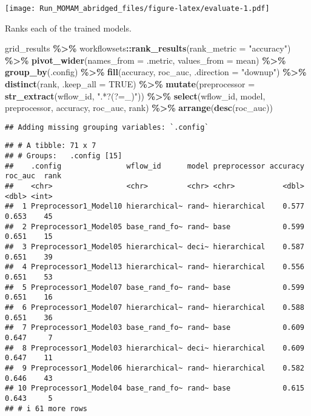 \documentclass[
]{article}
\newenvironment{Shaded}{\begin{snugshade}}{\end{snugshade}}
\newcommand{\AttributeTok}[1]{\textcolor[rgb]{0.13,0.29,0.53}{#1}}
\newcommand{\ConstantTok}[1]{\textcolor[rgb]{0.56,0.35,0.01}{#1}}
\newcommand{\FunctionTok}[1]{\textcolor[rgb]{0.13,0.29,0.53}{\textbf{#1}}}
\newcommand{\NormalTok}[1]{#1}
\newcommand{\SpecialCharTok}[1]{\textcolor[rgb]{0.81,0.36,0.00}{\textbf{#1}}}
\newcommand{\StringTok}[1]{\textcolor[rgb]{0.31,0.60,0.02}{#1}}
\begin{document}
\texttt{[image: Run\_MOMAM\_abridged\_files/figure-latex/evaluate-1.pdf]}

Ranks each of the trained models.

\begin{Shaded}
\begin{Highlighting}[]
\NormalTok{grid\_results }\SpecialCharTok{\%\textgreater{}\%} 
\NormalTok{  workflowsets}\SpecialCharTok{::}\FunctionTok{rank\_results}\NormalTok{(}\AttributeTok{rank\_metric =} \StringTok{"accuracy"}\NormalTok{) }\SpecialCharTok{\%\textgreater{}\%}
  \FunctionTok{pivot\_wider}\NormalTok{(}\AttributeTok{names\_from =}\NormalTok{ .metric, }\AttributeTok{values\_from =}\NormalTok{ mean) }\SpecialCharTok{\%\textgreater{}\%}
  \FunctionTok{group\_by}\NormalTok{(.config) }\SpecialCharTok{\%\textgreater{}\%} 
  \FunctionTok{fill}\NormalTok{(accuracy, roc\_auc, }\AttributeTok{.direction =} \StringTok{"downup"}\NormalTok{) }\SpecialCharTok{\%\textgreater{}\%}
  \FunctionTok{distinct}\NormalTok{(rank, }\AttributeTok{.keep\_all =} \ConstantTok{TRUE}\NormalTok{) }\SpecialCharTok{\%\textgreater{}\%}
  \FunctionTok{mutate}\NormalTok{(}\AttributeTok{preprocessor =} \FunctionTok{str\_extract}\NormalTok{(wflow\_id, }\StringTok{".*?(?=\_)"}\NormalTok{)) }\SpecialCharTok{\%\textgreater{}\%}
  \FunctionTok{select}\NormalTok{(wflow\_id, model, preprocessor, accuracy, roc\_auc, rank) }\SpecialCharTok{\%\textgreater{}\%}
  \FunctionTok{arrange}\NormalTok{(}\FunctionTok{desc}\NormalTok{(roc\_auc))}
\end{Highlighting}
\end{Shaded}

\begin{verbatim}
## Adding missing grouping variables: `.config`
\end{verbatim}

\begin{verbatim}
## # A tibble: 71 x 7
## # Groups:   .config [15]
##    .config               wflow_id      model preprocessor accuracy roc_auc  rank
##    <chr>                 <chr>         <chr> <chr>           <dbl>   <dbl> <int>
##  1 Preprocessor1_Model10 hierarchical~ rand~ hierarchical    0.577   0.653    45
##  2 Preprocessor1_Model05 base_rand_fo~ rand~ base            0.599   0.651    15
##  3 Preprocessor1_Model05 hierarchical~ deci~ hierarchical    0.587   0.651    39
##  4 Preprocessor1_Model13 hierarchical~ rand~ hierarchical    0.556   0.651    53
##  5 Preprocessor1_Model07 base_rand_fo~ rand~ base            0.599   0.651    16
##  6 Preprocessor1_Model07 hierarchical~ rand~ hierarchical    0.588   0.651    36
##  7 Preprocessor1_Model03 base_rand_fo~ rand~ base            0.609   0.647     7
##  8 Preprocessor1_Model03 hierarchical~ deci~ hierarchical    0.609   0.647    11
##  9 Preprocessor1_Model06 hierarchical~ rand~ hierarchical    0.582   0.646    43
## 10 Preprocessor1_Model04 base_rand_fo~ rand~ base            0.615   0.643     5
## # i 61 more rows
\end{verbatim}
\end{document}
